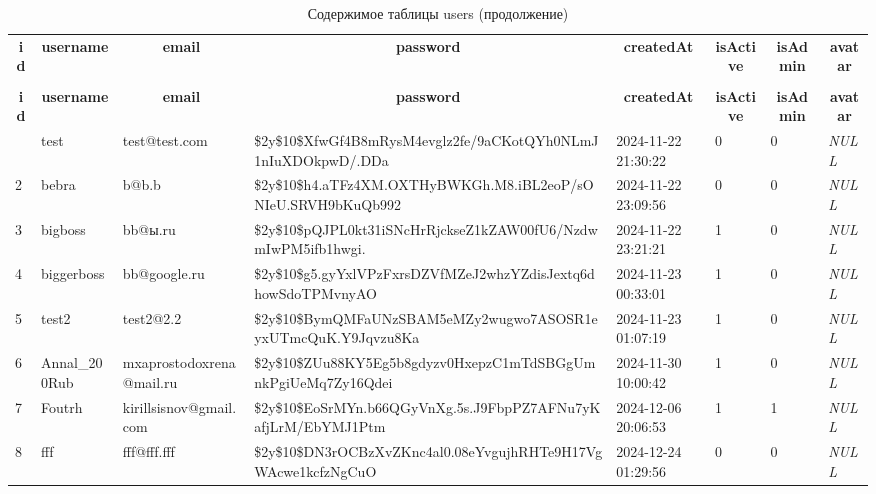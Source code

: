 %
%
 \begin{longtable}{|l|l|l|l|l|l|l|l|} 
 \hline \endhead \hline \endfoot \hline 
 \caption{Содержимое таблицы users} \label{tab:users-data} \\\hline \multicolumn{1}{|c|}{\textbf{id}} & \multicolumn{1}{|c|}{\textbf{username}} & \multicolumn{1}{|c|}{\textbf{email}} & \multicolumn{1}{|c|}{\textbf{password}} & \multicolumn{1}{|c|}{\textbf{createdAt}} & \multicolumn{1}{|c|}{\textbf{isActive}} & \multicolumn{1}{|c|}{\textbf{isAdmin}} & \multicolumn{1}{|c|}{\textbf{avatar}} \\ \hline \hline  \endfirsthead 
\caption{Содержимое таблицы users (продолжение)} \\ \hline \multicolumn{1}{|c|}{\textbf{id}} & \multicolumn{1}{|c|}{\textbf{username}} & \multicolumn{1}{|c|}{\textbf{email}} & \multicolumn{1}{|c|}{\textbf{password}} & \multicolumn{1}{|c|}{\textbf{createdAt}} & \multicolumn{1}{|c|}{\textbf{isActive}} & \multicolumn{1}{|c|}{\textbf{isAdmin}} & \multicolumn{1}{|c|}{\textbf{avatar}} \\ \hline \hline \endhead \endfoot
1 & test & test@test.com & \$2y\$10\$XfwGf4B8mRysM4evglz2fe/9aCKotQYh0NLmJ1nIuXDOkpwD/.DDa & 2024-11-22 21:30:22 & 0 & 0 & \textit{NULL} \\ \hline 
2 & bebra & b@b.b & \$2y\$10\$h4.aTFz4XM.OXTHyBWKGh.M8.iBL2eoP/sONIeU.SRVH9bKuQb992 & 2024-11-22 23:09:56 & 0 & 0 & \textit{NULL} \\ \hline 
3 & bigboss & bb@ы.ru & \$2y\$10\$pQJPL0kt31iSNcHrRjckseZ1kZAW00fU6/NzdwmIwPM5ifb1hwgi. & 2024-11-22 23:21:21 & 1 & 0 & \textit{NULL} \\ \hline 
4 & biggerboss & bb@google.ru & \$2y\$10\$g5.gyYxlVPzFxrsDZVfMZeJ2whzYZdisJextq6dhowSdoTPMvnyAO & 2024-11-23 00:33:01 & 1 & 0 & \textit{NULL} \\ \hline 
5 & test2 & test2@2.2 & \$2y\$10\$BymQMFaUNzSBAM5eMZy2wugwo7ASOSR1eyxUTmcQuK.Y9Jqvzu8Ka & 2024-11-23 01:07:19 & 1 & 0 & \textit{NULL} \\ \hline 
6 & Annal\_200Rub & mxaprostodoxrena@mail.ru & \$2y\$10\$ZUu88KY5Eg5b8gdyzv0HxepzC1mTdSBGgUmnkPgiUeMq7Zy16Qdei & 2024-11-30 10:00:42 & 1 & 0 & \textit{NULL} \\ \hline 
7 & Foutrh & kirillsisnov@gmail.com & \$2y\$10\$EoSrMYn.b66QGyVnXg.5s.J9FbpPZ7AFNu7yKafjLrM/EbYMJ1Ptm & 2024-12-06 20:06:53 & 1 & 1 & \textit{NULL} \\ \hline 
8 & fff & fff@fff.fff & \$2y\$10\$DN3rOCBzXvZKnc4al0.08eYvgujhRHTe9H17VgWAcwe1kcfzNgCuO & 2024-12-24 01:29:56 & 0 & 0 & \textit{NULL} \\ \hline 

\end{longtable}
